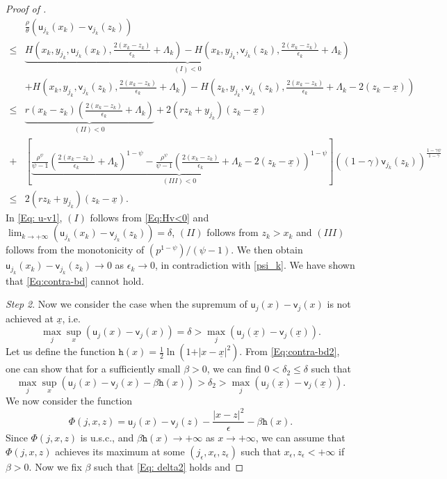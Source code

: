 \documentclass[11pt]{article}
\numberwithin{equation}{section}
\theoremstyle{definition}
\newcommand{\ux}{{\underline x}}
\newcommand{\beq}{\begin{equation}}
\newcommand{\eeq}{\end{equation}}
\newcommand{\f}{\frac}
\newcommand{\e}{\epsilon}
\newcommand{\g}{\gamma}
\newcommand{\p}{\psi}
\theoremstyle{plain}
\begin{document}
\begin{appendices}
\begin{proof}[Proof of ]
\beq\label{Eq: u-v1}
\begin{aligned}
&\frac{\rho}{\theta}  (\mathsf{u}_{j_{k}}(x_{k})-\mathsf{v}_{j_{k}}(z_{k}))\\
\leq {}&\underbrace{H\left(x_{k},y_{j_{k}},\mathsf{u}_{j_{k}}(x_{k}),\frac{2( x_{k}-z_{k} )}{\e_k}+\Lambda_k \right)-H\left(x_{k},y_{j_{k}},\mathsf{v}_{j_{k}}(z_{k}),\frac{2( x_{k}-z_{k} )}{\e_k}+\Lambda_k \right)}_{(I)<0}\\
&+H\left(x_{k},y_{j_{k}},\mathsf{v}_{j_{k}}(z_{k}),\frac{2( x_{k}-z_{k} )}{\e_k}+\Lambda_k \right)-H\left(z_{k},y_{j_{k}},\mathsf{v}_{j_{k}}(z_{k}),\frac{2( x_{k}-z_{k} )}{\e_k}+\Lambda_k-2(z_{k}-\ux) \right)\\
\leq {}& \underbrace{r(x_{k}-z_{k})\left(\frac{2( x_{k}-z_{k} )}{\e_k}+\Lambda_k\right)}_{(II)<0}+2(rz_{k}+y_{j_{k}})(z_{k}-\ux)\\
+&\left[\underbrace{\frac{\rho^{\p}}{\p-1}\left(\frac{2( x_{k}-z_{k} )}{\e_k}+\Lambda_k \right)^{1-\p}
-\frac{\rho^{\p}}{\p-1}\left(\frac{2( x_{k}-z_{k} )}{\e_k}+\Lambda_k-2(z_{k}-\ux) \right)^{1-\p}}_{(III)<0}\right]((1-\g)\mathsf{v}_{j_{k}}(z_{k}))^{\frac{1-\g \p}{1-\g}}\\
\leq {}& 2(rz_{k}+y_{j_{k}})(z_k-\ux).
\end{aligned}
\eeq
In \eqref{Eq: u-v1}, $(I)$ follows from \eqref{Eq:Hv<0} and $
\lim_{k\to +\infty}(\mathsf{u}_{j_{k}}(x_{k})-\mathsf{v}_{j_{k}}(z_{k}))=\delta 
$, $(II)$ follows from $z_k>x_k$ and $(III)$ follows from the monotonicity of $(p^{1-\p})/(\p-1)$. We then obtain $\mathsf{u}_{j_{k}}(x_{k})-\mathsf{v}_{j_{k}}(z_{k})\to 0$ as $\e_k\to 0$, in contradiction with \eqref{psi_k}. We have shown that \eqref{Eq:contra-bd} cannot hold. \par
{\it{Step 2}}. Now we consider the case when {}{the supremum of $\mathsf{u}_j(x)-\mathsf{v}_j(x)$} is not achieved at $\ux$, i.e. 
\beq\label{Eq:contra-bd2}
\max_j\sup_x(\mathsf{u}_j(x)-\mathsf{v}_j(x))=\delta>\max_j(\mathsf{u}_j(\ux)-\mathsf{v}_j(\ux)).
\eeq
Let us define the function $\mathtt{h}(x)=\f{1}{2}\ln (1+\vert x-\ux \vert^2)$. From \eqref{Eq:contra-bd2}, one can show that for a sufficiently small $\beta>0$, we can find $0<\delta_2\leq \delta$ such that  
 \beq\label{Eq: delta2}
 \max_j\sup_x(\mathsf{u}_j(x)-\mathsf{v}_j(x)-\beta \mathtt{h}(x))>\delta_2>\max_j(\mathsf{u}_j(\ux)-\mathsf{v}_j(\ux)).
 \eeq
We now consider the function
\beq
\Phi(j,x,z)=\mathsf{u}_j(x)-\mathsf{v}_j(z)-\frac{\vert x-z\vert^2}{\e}-\beta \mathtt{h}(x).
\eeq
Since $\Phi(j,x,z)$ is u.s.c., and $\beta \mathtt{h}(x)\to +\infty$ as $x\to +\infty$, we can assume that $\Phi(j,x,z)$ achieves its maximum at some $(j_\e,x_\e,z_\e)$ such that $x_\e,z_\e<+\infty$ if $\beta>0$. Now we fix $\beta$ such that \cref{Eq: delta2} holds and 

\end{proof}
\end{appendices}
\end{document}
